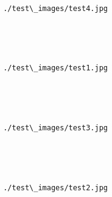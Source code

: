 \documentclass[11pt]{article}
\begin{document}
    \begin{center}
    \end{center}
    { \hspace*{\fill} \\}
    
    \begin{Verbatim}[commandchars=\\\{\}]


 ./test\_images/test4.jpg

    \end{Verbatim}

    \begin{center}
    \end{center}
    { \hspace*{\fill} \\}
    
    \begin{Verbatim}[commandchars=\\\{\}]


 ./test\_images/test1.jpg

    \end{Verbatim}

    \begin{center}
    \end{center}
    { \hspace*{\fill} \\}
    
    \begin{Verbatim}[commandchars=\\\{\}]


 ./test\_images/test3.jpg

    \end{Verbatim}

    \begin{center}
    \end{center}
    { \hspace*{\fill} \\}
    
    \begin{Verbatim}[commandchars=\\\{\}]


 ./test\_images/test2.jpg

    \end{Verbatim}
\end{document}
